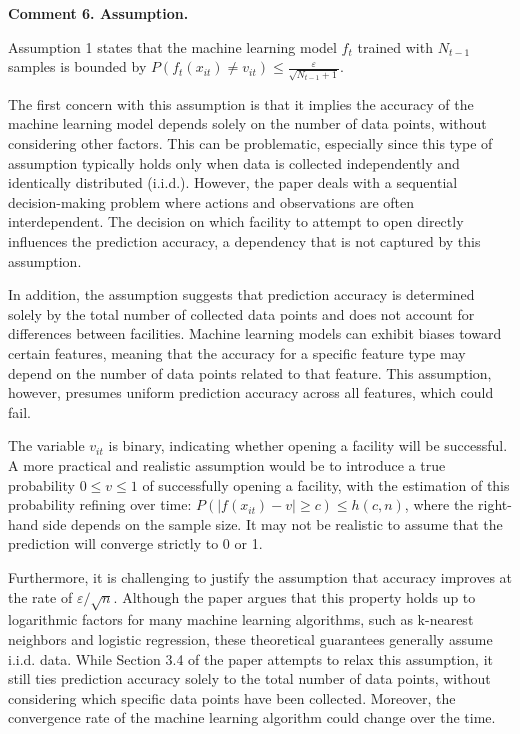 \documentclass[11pt]{article}
\begin{document}
\begin{commentBox}
    \textbf{Comment 6. Assumption.}\label{R2:6}

    Assumption 1 states that the machine learning model $f_t$ trained with $N_{t-1}$ samples is bounded by $P(f_t(x_{it})\neq v_{it})\leq \frac{\varepsilon}{\sqrt{N_{t-1}+1}}$.

    The first concern with this assumption is that it implies the accuracy of the machine learning model depends solely on the number of data points, without considering other factors. This can be problematic, especially since this type of assumption typically holds only when data is collected independently and identically distributed (i.i.d.). However, the paper deals with a sequential decision-making problem where actions and observations are often interdependent. The decision on which facility to attempt to open directly influences the prediction accuracy, a dependency that is not captured by this assumption.

    In addition, the assumption suggests that prediction accuracy is determined solely by the total number of collected data points and does not account for differences between facilities. Machine learning models can exhibit biases toward certain features, meaning that the accuracy for a specific feature type may depend on the number of data points related to that feature. This assumption, however, presumes uniform prediction accuracy across all features, which could fail.

    The variable $v_{it}$ is binary, indicating whether opening a facility will be successful. A more practical and realistic assumption would be to introduce a true probability $0\leq v\leq 1$ of successfully opening a facility, with the estimation of this probability refining over time: $P(|f(x_{it})-v|\geq c)\leq h(c,n)$, where the right-hand side depends on the sample size. It may not be realistic to assume that the prediction will converge strictly to 0 or 1.
    
    Furthermore, it is challenging to justify the assumption that accuracy improves at the rate of $\varepsilon/\sqrt{n}$. Although the paper argues that this property holds up to logarithmic factors for many machine learning algorithms, such as k-nearest neighbors and logistic regression, these theoretical guarantees generally assume i.i.d. data. While Section 3.4 of the paper attempts to relax this assumption, it still ties prediction accuracy solely to the total number of data points, without considering which specific data points have been collected. Moreover, the convergence rate of the machine learning algorithm could change over the time.
\end{commentBox}
\end{document}
